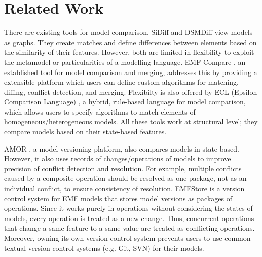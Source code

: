 \documentclass{llncs}
\begin{document}
\section{Related Work}
\label{sec:related_work}
There are existing tools for model comparison. SiDiff \cite{Treude2007SiDiff} and DSMDiff \cite{lin2009dsmdiff} view models as graphs. They create matches and define differences between elements based on the similarity of their features. However, both are limited in flexibility to exploit the metamodel or particularities of a modelling language. EMF Compare \cite{emfcompare2018developer}, an established tool for model comparison and merging, addresses this by providing a extensible platform which users can define custom algorithms for matching, diffing, conflict detection, and merging. Flexibilty is also offered by ECL (Epsilon Comparison Language) \cite{kolovos2009ecl}, a hybrid, rule-based language for model comparison, which allows users to specify algorithms to match elements of homogeneous/heterogeneous models. All these tools work at structural level; they compare models based on their state-based features.

AMOR \cite{DBLP:conf/sfm/BroschKLSWW12}, a model versioning platform, also compares models in state-based. However, it also uses records of changes/operations of models to improve precision of conflict detection and resolution. For example, multiple conflicts caused by a composite operation should be resolved as one package, not as an individual conflict, to ensure consistency of resolution. EMFStore \cite{koegel2010emfstore} is a version control system for EMF models that stores model versions as packages of operations. Since it works purely in operations without considering the states of models, every operation is treated as a new change. Thus, concurrent operations that change a same feature to a same value are treated as conflicting operations. Moreover, owning its own version control system prevents users to use common textual version control systems (e.g. Git, SVN) for their models.  

\end{document}
